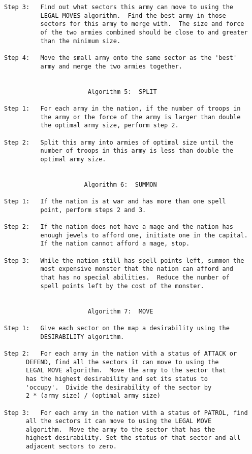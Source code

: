 \begin{verbatim}
Step 3:   Find out what sectors this army can move to using the
          LEGAL MOVES algorithm.  Find the best army in those
          sectors for this army to merge with.  The size and force
          of the two armies combined should be close to and greater
          than the minimum size.

Step 4:   Move the small army onto the same sector as the 'best'
          army and merge the two armies together.


                       Algorithm 5:  SPLIT

Step 1:   For each army in the nation, if the number of troops in
          the army or the force of the army is larger than double
          the optimal army size, perform step 2.

Step 2:   Split this army into armies of optimal size until the
          number of troops in this army is less than double the
          optimal army size.


                      Algorithm 6:  SUMMON

Step 1:   If the nation is at war and has more than one spell
          point, perform steps 2 and 3.

Step 2:   If the nation does not have a mage and the nation has
          enough jewels to afford one, initiate one in the capital. 
          If the nation cannot afford a mage, stop.

Step 3:   While the nation still has spell points left, summon the
          most expensive monster that the nation can afford and
          that has no special abilities.  Reduce the number of
          spell points left by the cost of the monster.


                       Algorithm 7:  MOVE

Step 1:   Give each sector on the map a desirability using the
          DESIRABILITY algorithm.

Step 2:   For each army in the nation with a status of ATTACK or
	  DEFEND, find all the sectors it can move to using the
	  LEGAL MOVE algorithm.  Move the army to the sector that
	  has the highest desirability and set its status to
	  'occupy'.  Divide the desirability of the sector by
	  2 * (army size) / (optimal army size)

Step 3:   For each army in the nation with a status of PATROL, find
	  all the sectors it can move to using the LEGAL MOVE
	  algorithm.  Move the army to the sector that has the
	  highest desirability. Set the status of that sector and all
	  adjacent sectors to zero.



\end{verbatim}

